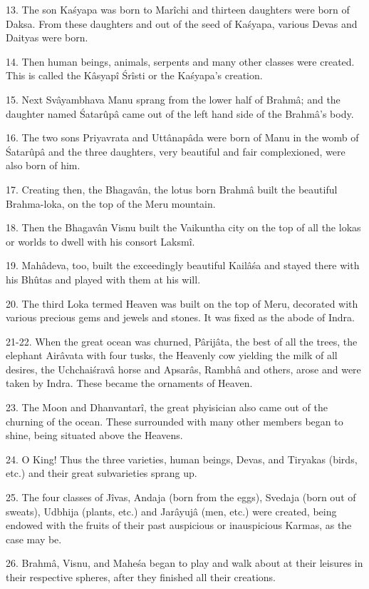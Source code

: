 13. The son Ka\'syapa was born to Mar\^ichi and thirteen daughters were born of Daksa. From these daughters and out of the seed of Ka\'syapa, various Devas and Daityas were born.

14. Then human beings, animals, serpents and many other classes were created. This is called the K\^asyap\^i \'Sr\^isti or the Ka\'syapa's creation.

15. Next Sv\^ayambhava Manu sprang from the lower half of Brahm\^a; and the daughter named \'Satarûp\^a came out of the left hand side of the Brahm\^a's body.

16. The two sons Priyavrata and Utt\^anap\^ada were born of Manu in the womb of \'Satarûp\^a and the three daughters, very beautiful and fair complexioned, were also born of him.

17. Creating then, the Bhagav\^an, the lotus born Brahm\^a built the beautiful Brahma-loka, on the top of the Meru mountain.

18. Then the Bhagav\^an Visnu built the Vaikuntha city on the top of all the lokas or worlds to dwell with his consort Laksm\^i.

19. Mah\^adeva, too, built the exceedingly beautiful Kail\^a\'sa and stayed there with his Bhûtas and played with them at his will.

20. The third Loka termed Heaven was built on the top of Meru, decorated with various precious gems and jewels and stones. It was fixed as the abode of Indra.

21-22. When the great ocean was churned, P\^arij\^ata, the best of all the trees, the elephant Air\^avata with four tusks, the Heavenly cow yielding the milk of all desires, the Uchchai\'srav\^a horse and Apsar\^as, Rambh\^a and others, arose and were taken by Indra. These became the ornaments of Heaven.

23. The Moon and Dhanvantar\^i, the great phyisician also came out of the churning of the ocean. These surrounded with many other members began to shine, being situated above the Heavens.

24. O King! Thus the three varieties, human beings, Devas, and Tiryakas (birds, etc.) and their great subvarieties sprang up.

25. The four classes of J\^ivas, Andaja (born from the eggs), Svedaja (born out of sweats), Udbhija (plants, etc.) and Jar\^ayuj\^a (men, etc.) were created, being endowed with the fruits of their past auspicious or inauspicious Karmas, as the case may be.

26. Brahm\^a, Visnu, and Mahe\'sa began to play and walk about at their leisures in their respective spheres, after they finished all their creations.

